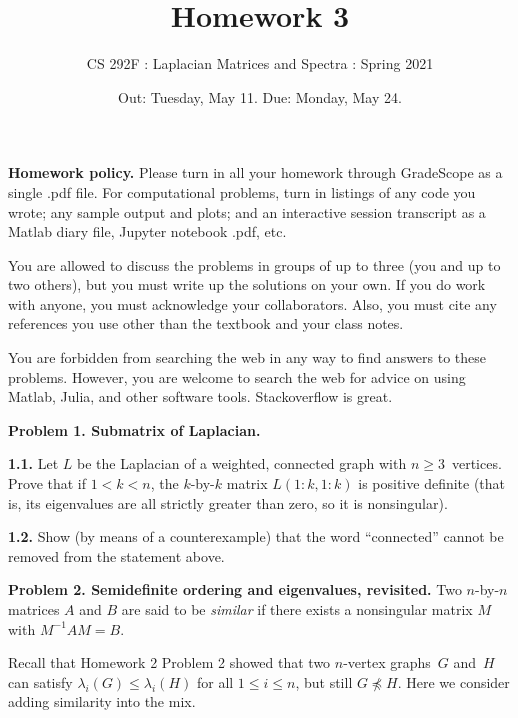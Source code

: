 \documentclass[11pt]{article}
\begin{document}

\title{Homework 3}
\author{CS 292F : Laplacian Matrices and Spectra : Spring 2021}

\date{Out: Tuesday, May 11. Due: Monday, May 24.}
\maketitle

{\bf Homework policy.} 
Please turn in all your homework through GradeScope as a single .pdf file.
For computational problems, turn in listings of any code you wrote; 
any sample output and plots; and an interactive session transcript as
a Matlab diary file, Jupyter notebook .pdf, etc.

You are allowed to discuss the problems in groups of up to three 
(you and up to two others), but you must write up the solutions 
on your own. If you do work with anyone, you must acknowledge your
collaborators. Also, you must cite any references you use other than
the textbook and your class notes.

You are forbidden from searching the web in any way to find answers
to these problems. However, you are welcome to search the web for
advice on using Matlab, Julia, and other software tools. Stackoverflow
is great.

\par\bigskip
{\bf Problem 1. Submatrix of Laplacian.}

\par\medskip
{\bf 1.1.} 
Let $L$ be the Laplacian of a weighted, connected graph 
with $n\ge 3$~vertices.
Prove that if $1<k<n$, the $k$-by-$k$ matrix $L(1:k,1:k)$ is 
positive definite (that is, its eigenvalues are all strictly greater
than zero, so it is nonsingular).

\par\medskip
{\bf 1.2.} 
Show (by means of a counterexample) that the word ``connected''
cannot be removed from the statement above.

\par\bigskip
{\bf Problem 2. Semidefinite ordering and eigenvalues, revisited.} 
Two $n$-by-$n$ matrices $A$ and $B$ are said to be {\em similar} 
if there exists a nonsingular matrix $M$ with $M^{-1}AM = B$.

Recall that Homework 2 Problem 2 showed that two $n$-vertex
graphs~$G$ and~$H$ can satisfy
$\lambda_i(G)\le\lambda_i(H)$ for all $1\le i\le n$, 
but still $G\not\preceq H$.
Here we consider adding similarity into the mix.
\end{document}
